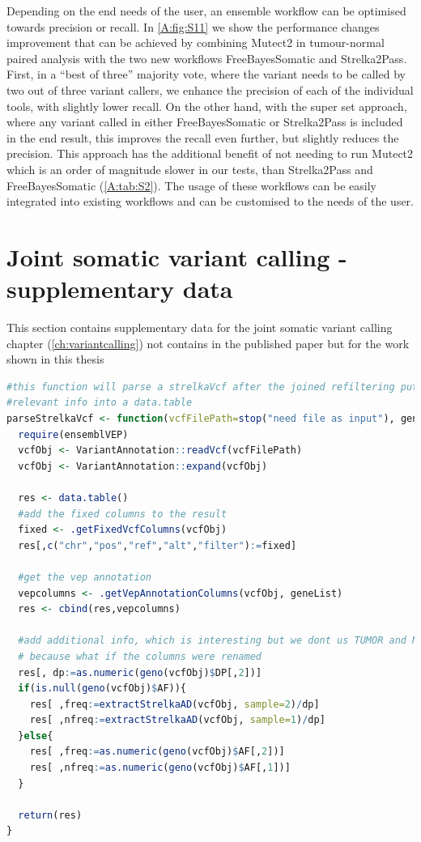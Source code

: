 Depending on the end needs of the user, an ensemble workflow can be optimised towards precision or recall. In \autoref{A:fig:S11} we show the performance changes improvement that can be achieved by combining Mutect2 in tumour-normal paired analysis with the two new workflows FreeBayesSomatic and Strelka2Pass. First, in a “best of three” majority vote, where the variant needs to be called by two out of three variant callers, we enhance the precision of each of the individual tools, with slightly lower recall.
On the other hand, with the super set approach, where any variant called in either FreeBayesSomatic or Strelka2Pass is included in the end result, this improves the recall even further, but slightly reduces the precision. This approach has the additional benefit of not needing to run Mutect2 which is an order of magnitude slower in our tests, than Strelka2Pass and FreeBayesSomatic (\autoref{A:tab:S2}).
The usage of these workflows can be easily integrated into existing workflows and  can be customised to the needs of the user.



\chapter{Joint somatic variant calling - supplementary data}
\label{A:ch:jsvSupp}

This section contains supplementary data for the joint somatic variant calling chapter (\autoref{ch:variantcalling}) not contains in the published paper but for the work shown in this thesis

\begin{lstlisting}[language=R, caption=parse strelka VCF, label={lst-jvcAppendix:parseVcf}]
#this function will parse a strelkaVcf after the joined refiltering put all the
#relevant info into a data.table
parseStrelkaVcf <- function(vcfFilePath=stop("need file as input"), geneList){
  require(ensemblVEP)
  vcfObj <- VariantAnnotation::readVcf(vcfFilePath)
  vcfObj <- VariantAnnotation::expand(vcfObj)

  res <- data.table()
  #add the fixed columns to the result
  fixed <- .getFixedVcfColumns(vcfObj)
  res[,c("chr","pos","ref","alt","filter"):=fixed]

  #get the vep annotation
  vepcolumns <- .getVepAnnotationColumns(vcfObj, geneList)
  res <- cbind(res,vepcolumns)

  #add additional info, which is interesting but we dont us TUMOR and NORMAL
  # because what if the columns were renamed
  res[, dp:=as.numeric(geno(vcfObj)$DP[,2])]
  if(is.null(geno(vcfObj)$AF)){
    res[ ,freq:=extractStrelkaAD(vcfObj, sample=2)/dp]
    res[ ,nfreq:=extractStrelkaAD(vcfObj, sample=1)/dp]
  }else{
    res[ ,freq:=as.numeric(geno(vcfObj)$AF[,2])]
    res[ ,nfreq:=as.numeric(geno(vcfObj)$AF[,1])]
  }

  return(res)
}
\end{lstlisting}

